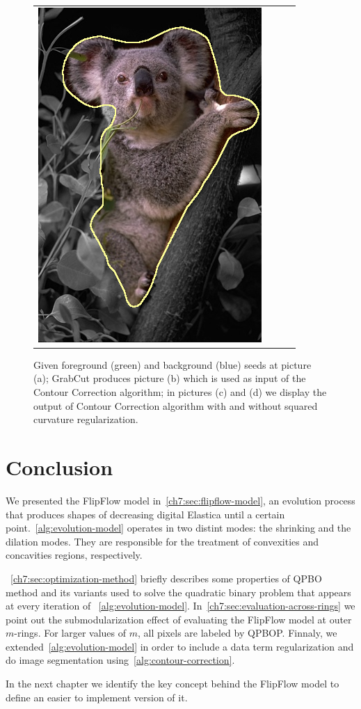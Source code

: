 \begin{figure}
\begin{tabular}{cccc}
 	\includegraphics[scale=0.25]{figures/chapter6/segmentation/coala/mt_improve/radius_5/data_0.50/sq_1.00/length_0.50/it_50/corrected-seg.png}
\end{tabular}	
\caption{Given foreground (green) and background (blue) seeds at picture (a); GrabCut produces picture (b) which is used as input of the Contour Correction algorithm; in pictures (c) and (d) we display the output of Contour Correction algorithm with and without squared curvature regularization. }
\label{fig:ch6-segmentation}
\end{figure}

\section{Conclusion}
\label{ch7:sec:conclusion}
We presented the FlipFlow model in~\cref{ch7:sec:flipflow-model}, an evolution process that produces shapes of decreasing digital Elastica until a certain point.~\cref{alg:evolution-model} operates in two distint modes: the shrinking and the dilation modes. They are responsible for the treatment of convexities and concavities regions, respectively. 


~\cref{ch7:sec:optimization-method} briefly describes some properties of QPBO method and its variants used to solve the quadratic binary problem that appears at every iteration of ~\cref{alg:evolution-model}. In~\cref{ch7:sec:evaluation-across-rings} we point out the submodularization effect of evaluating the FlipFlow model at outer $m$-rings. For larger values of $m$, all pixels are labeled by QPBOP. Finnaly, we extended~\cref{alg:evolution-model} in order to include a data term regularization and do image segmentation using~\cref{alg:contour-correction}.


In the next chapter we identify the key concept behind the FlipFlow model to define an easier to implement version of it.

